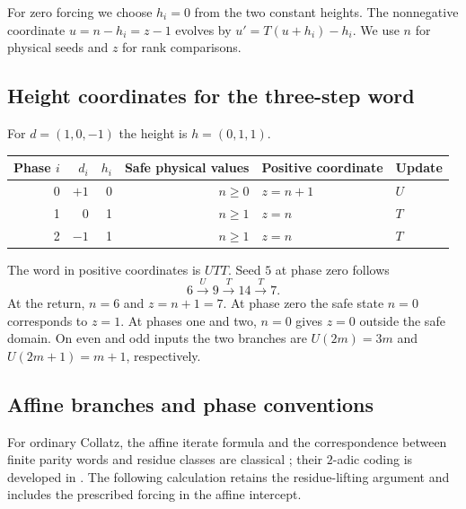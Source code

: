 For zero forcing we choose $h_i=0$ from the two constant heights. The
nonnegative coordinate $u=n-h_i=z-1$ evolves by $u'=T(u+h_i)-h_i$.
We use $n$ for physical seeds and $z$ for rank comparisons.

\subsection{Height coordinates for the three-step word}

For $d=(1,0,-1)$ the height is $h=(0,1,1)$.

\begin{center}
\begin{tabular}{rrrrll}\toprule
Phase $i$ & $d_i$ & $h_i$ & Safe physical values & Positive coordinate & Update\\\midrule
0&$+1$&0&$n\ge0$&$z=n+1$&$U$\\
1&0&1&$n\ge1$&$z=n$&$T$\\
2&$-1$&1&$n\ge1$&$z=n$&$T$\\\bottomrule
\end{tabular}
\end{center}
The word in positive coordinates is $UTT$. Seed $5$ at phase zero follows
\begin{equation}\label{eq:height-worked-path}
 6\xrightarrow{U}9\xrightarrow{T}14\xrightarrow{T}7.
\end{equation}
At the return, $n=6$ and $z=n+1=7$. At phase zero the safe state
$n=0$ corresponds to $z=1$. At phases one and two, $n=0$ gives
$z=0$ outside the safe domain. On even and odd inputs the two branches
are $U(2m)=3m$ and $U(2m+1)=m+1$, respectively.

\subsection{Affine branches and phase conventions}

For ordinary Collatz, the affine iterate formula and the correspondence
between finite parity words and residue classes are classical
\cite[Theorems~1.1--1.2]{terras-1976}; their $2$-adic coding is developed
in \cite[\S~1 and Appendix~B]{bernstein-lagarias-1996}.
The following calculation retains the residue-lifting argument and
includes the prescribed forcing in the affine intercept.

